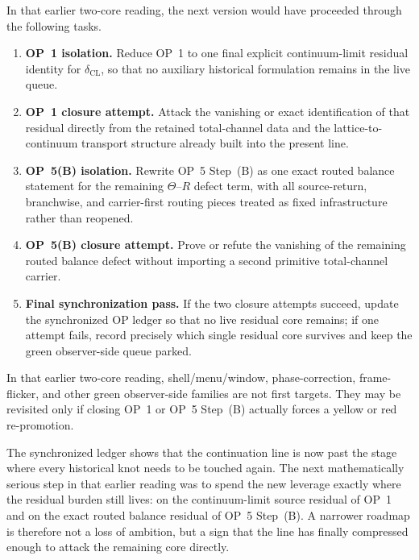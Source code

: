 \begin{proposition}
In that earlier two-core reading, the next version would have proceeded through the following tasks.
\begin{enumerate}[leftmargin=2em]
  \item \textbf{OP~1 isolation.} Reduce OP~1 to one final explicit continuum-limit residual identity for \(\delta_{\mathrm{CL}}\), so that no auxiliary historical formulation remains in the live queue.
  \item \textbf{OP~1 closure attempt.} Attack the vanishing or exact identification of that residual directly from the retained total-channel data and the lattice-to-continuum transport structure already built into the present line.
  \item \textbf{OP~5(B) isolation.} Rewrite OP~5 Step~(B) as one exact routed balance statement for the remaining \(\Theta\)--\(R\) defect term, with all source-return, branchwise, and carrier-first routing pieces treated as fixed infrastructure rather than reopened.
  \item \textbf{OP~5(B) closure attempt.} Prove or refute the vanishing of the remaining routed balance defect without importing a second primitive total-channel carrier.
  \item \textbf{Final synchronization pass.} If the two closure attempts succeed, update the synchronized OP ledger so that no live residual core remains; if one attempt fails, record precisely which single residual core survives and keep the green observer-side queue parked.
\end{enumerate}
\end{proposition}

\begin{corollary}
In that earlier two-core reading, shell/menu/window, phase-correction, frame-flicker, and other green observer-side families are not first targets. They may be revisited only if closing OP~1 or OP~5 Step~(B) actually forces a yellow or red re-promotion.
\end{corollary}

\begin{remark}
The synchronized ledger shows that the continuation line is now past the stage where every historical knot needs to be touched again. The next mathematically serious step in that earlier reading was to spend the new leverage exactly where the residual burden still lives: on the continuum-limit source residual of OP~1 and on the exact routed balance residual of OP~5 Step~(B). A narrower roadmap is therefore not a loss of ambition, but a sign that the line has finally compressed enough to attack the remaining core directly.
\end{remark}




